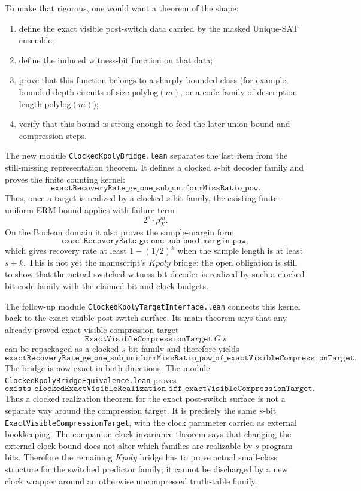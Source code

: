 \documentclass[11pt]{article}
\theoremstyle{remark}
\begin{document}
To make that rigorous, one would want a theorem of the shape:
\begin{enumerate}[leftmargin=1.5em]
  \item define the exact visible post-switch data carried by the masked Unique-SAT ensemble;
  \item define the induced witness-bit function on that data;
  \item prove that this function belongs to a sharply bounded class
  (for example, bounded-depth circuits of size \(\mathrm{polylog}(m)\), or a code family of
  description length \(\mathrm{polylog}(m)\));
  \item verify that this bound is strong enough to feed the later union-bound and compression steps.
\end{enumerate}

The new module \texttt{ClockedKpolyBridge.lean} separates the last item from
the still-missing representation theorem.  It defines a clocked \(s\)-bit
decoder family and proves the finite counting kernel:
\[
  \texttt{exactRecoveryRate\_ge\_one\_sub\_uniformMissRatio\_pow}.
\]
Thus, once a target is realized by a clocked \(s\)-bit family, the existing
finite-uniform ERM bound applies with failure term
\[
  2^s \cdot \rho_X^m.
\]
On the Boolean domain it also proves the sample-margin form
\[
  \texttt{exactRecoveryRate\_ge\_one\_sub\_bool\_margin\_pow},
\]
which gives recovery rate at least \(1-(1/2)^k\) when the sample length is at
least \(s+k\).  This is not yet the manuscript's \(Kpoly\) bridge: the open
obligation is still to show that the actual switched witness-bit decoder is
realized by such a clocked bit-code family with the claimed bit and clock
budgets.

The follow-up module \texttt{ClockedKpolyTargetInterface.lean} connects this
kernel back to the exact visible post-switch surface.  Its main theorem says
that any already-proved exact visible compression target
\[
  \texttt{ExactVisibleCompressionTarget}\ G\ s
\]
can be repackaged as a clocked \(s\)-bit family and therefore yields
\[
  \texttt{exactRecoveryRate\_ge\_one\_sub\_uniformMissRatio\_pow\_of\_exactVisibleCompressionTarget}.
\]
The bridge is now exact in both directions.  The module
\texttt{ClockedKpolyBridgeEquivalence.lean} proves
\[
  \texttt{exists\_clockedExactVisibleRealization\_iff\_exactVisibleCompressionTarget}.
\]
Thus a clocked realization theorem for the exact post-switch surface is not a
separate way around the compression target.  It is precisely the same
\(s\)-bit \texttt{ExactVisibleCompressionTarget}, with the clock parameter
carried as external bookkeeping.  The companion clock-invariance theorem says
that changing the external clock bound does not alter which families are
realizable by \(s\) program bits.  Therefore the remaining \(Kpoly\) bridge has
to prove actual small-class structure for the switched predictor family; it
cannot be discharged by a new clock wrapper around an otherwise uncompressed
truth-table family.
\end{document}
